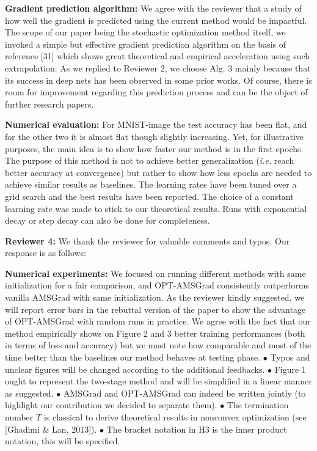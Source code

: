 \documentclass{article}
\begin{document}
\textbf{Gradient prediction algorithm:}
We agree with the reviewer that a study of how well the gradient is predicted using the current method would be impactful.
The scope of our paper being the stochastic optimization method itself, we invoked a simple but effective gradient prediction algorithm on the basis of reference [31] which shows great theoretical and empirical acceleration using such extrapolation. 
As we replied to Reviewer 2, we choose Alg. 3 mainly because that its success in deep nets has been observed in some prior works.
Of course, there is room for improvement regarding this prediction process and can be the object of further research papers.\vspace{-5pt}


\textbf{Numerical evaluation:}  For MNIST-image the test accuracy has been flat, and for the other two it is almost flat though slightly increasing.
Yet, for illustrative purposes, the main idea is to show how faster our method is in the first epochs.
The purpose of this method is not to achieve better generalization (\textit{i.e.} reach better accuracy at convergence) but rather to show how less epochs are needed to achieve similar results as baselines.
The learning rates have been tuned over a grid search and the best results have been reported. The choice of a constant learning rate was made to stick to our theoretical results.
Runs with exponential decay or step decay can also be done for completeness.


\textbf{\textcolor{yellow!50!black}{Reviewer 4:}} We thank the reviewer for valuable comments and typos. Our response is as follows:\vspace{-5pt}

\textbf{Numerical experiments:}
We focused on running different methods with same initialization for a fair comparison, and OPT-AMSGrad consistently outperforms vanilla AMSGrad with same initialization. As the reviewer kindly suggested, we will report error bars in the rebuttal version of the paper to show the advantage of OPT-AMSGrad with random runs in practice.
We agree with the fact that our method empirically shows on Figure 2 and 3 better training performances (both in terms of loss and accuracy) but we must note how comparable and most of the time better than the baselines our method behaves at testing phase.
$\bullet$ Typos and unclear figures will be changed according to the additional feedbacks.
$\bullet$ Figure 1 ought to represent the two-stage method and will be simplified in a linear manner as suggested. $\bullet$ AMSGrad and OPT-AMSGrad can indeed be written jointly (to highlight our contribution we decided to separate them). $\bullet$ The termination number $T$ is classical to derive theoretical results in nonconvex optimization (see [Ghadimi \& Lan, 2013]). $\bullet$ The bracket notation in H3 is the inner product notation, this will be specified.
\end{document}
